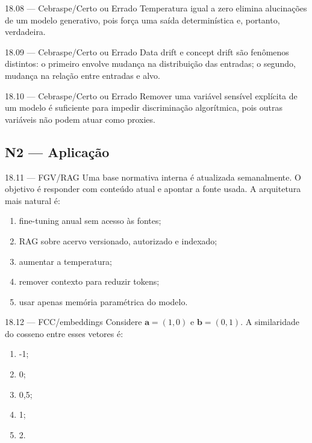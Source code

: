 \begin{questao}{ 18.08 — Cebraspe/Certo ou Errado}
Temperatura igual a zero elimina alucinações de um modelo generativo, pois força uma saída determinística e, portanto, verdadeira.
\end{questao}

\begin{questao}{ 18.09 — Cebraspe/Certo ou Errado}
Data drift e concept drift são fenômenos distintos: o primeiro envolve mudança na distribuição das entradas; o segundo, mudança na relação entre entradas e alvo.
\end{questao}

\begin{questao}{ 18.10 — Cebraspe/Certo ou Errado}
Remover uma variável sensível explícita de um modelo é suficiente para impedir discriminação algorítmica, pois outras variáveis não podem atuar como proxies.
\end{questao}

\subsection*{N2 — Aplicação}

\begin{questao}{ 18.11 — FGV/RAG}
Uma base normativa interna é atualizada semanalmente. O objetivo é responder com conteúdo atual e apontar a fonte usada. A arquitetura mais natural é:
\begin{enumerate}[label=\Alph*)]
\item fine-tuning anual sem acesso às fontes;
\item RAG sobre acervo versionado, autorizado e indexado;
\item aumentar a temperatura;
\item remover contexto para reduzir tokens;
\item usar apenas memória paramétrica do modelo.
\end{enumerate}
\end{questao}

\begin{questao}{ 18.12 — FCC/embeddings}
Considere $\mathbf{a}=(1,0)$ e $\mathbf{b}=(0,1)$. A similaridade do cosseno entre esses vetores é:
\begin{enumerate}[label=\Alph*)]
\item -1;
\item 0;
\item 0,5;
\item 1;
\item 2.
\end{enumerate}
\end{questao}

